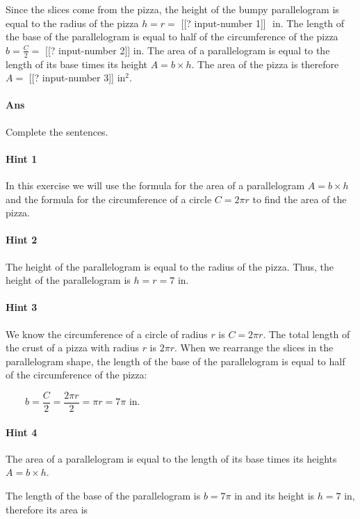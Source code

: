 \documentclass[twocolumn,10pt]{article}
\begin{document}
Since the slices come from the pizza, the height of the bumpy parallelogram is equal to the radius of the pizza  $h=r=$ [[? input-number 1]] $\text{ in}$.  
The length of the base of the parallelogram is \DIFaddbegin {}\DIFaddend equal to half of the circumference of the pizza $b=\frac{C}{2}=$  [[? input-number 2]]$\text{ in}$.  
The area of a parallelogram is equal to the length of its base times its height $A=b\times h$. The area of the pizza is therefore $A=$ [[? input-number 3]] $\text{in}^2$. 

\paragraph{Ans} Complete the sentences. 

\paragraph{Hint 1}In this exercise we will use the formula for the area of a parallelogram $A=b\times h$ and the formula for the circumference of a circle $C=2\pi r$ to find the area of the pizza.

\paragraph{Hint 2}The height of the parallelogram is equal to the radius  of the pizza. Thus, the height of the parallelogram is $h=r=7\text{ in}$.

\paragraph{Hint 3}We know the circumference of a circle of radius $r$ is $C=2\pi r$. The total length of the crust of a pizza with radius $r$ is $2\pi r$. When we rearrange the slices in the parallelogram shape, the length of the base of the parallelogram is equal to half of the circumference of the pizza:

$\qquad b = \dfrac{C}{2} = \dfrac{ 2 \pi r }{2}= \pi r=7\pi\text{ in}$.


\paragraph{Hint 4}The area of a parallelogram is equal to the length of its base times its heights $A=b\times h$.

The length of the base of the parallelogram is $b=7\pi\text{ in}$ and its height is $h=7\text{ in}$, therefore its area is 
\end{document}
